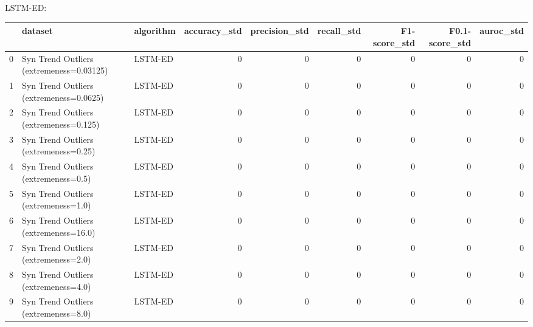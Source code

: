 LSTM-ED:

\begin{tabular}{rllrrrrrr}
\hline
    & dataset                                  & algorithm   &   accuracy\_std &   precision\_std &   recall\_std &   F1-score\_std &   F0.1-score\_std &   auroc\_std \\
\hline
  0 & Syn Trend Outliers (extremeness=0.03125) & LSTM-ED     &              0 &               0 &            0 &              0 &                0 &           0 \\
  1 & Syn Trend Outliers (extremeness=0.0625)  & LSTM-ED     &              0 &               0 &            0 &              0 &                0 &           0 \\
  2 & Syn Trend Outliers (extremeness=0.125)   & LSTM-ED     &              0 &               0 &            0 &              0 &                0 &           0 \\
  3 & Syn Trend Outliers (extremeness=0.25)    & LSTM-ED     &              0 &               0 &            0 &              0 &                0 &           0 \\
  4 & Syn Trend Outliers (extremeness=0.5)     & LSTM-ED     &              0 &               0 &            0 &              0 &                0 &           0 \\
  5 & Syn Trend Outliers (extremeness=1.0)     & LSTM-ED     &              0 &               0 &            0 &              0 &                0 &           0 \\
  6 & Syn Trend Outliers (extremeness=16.0)    & LSTM-ED     &              0 &               0 &            0 &              0 &                0 &           0 \\
  7 & Syn Trend Outliers (extremeness=2.0)     & LSTM-ED     &              0 &               0 &            0 &              0 &                0 &           0 \\
  8 & Syn Trend Outliers (extremeness=4.0)     & LSTM-ED     &              0 &               0 &            0 &              0 &                0 &           0 \\
  9 & Syn Trend Outliers (extremeness=8.0)     & LSTM-ED     &              0 &               0 &            0 &              0 &                0 &           0 \\
\hline
\end{tabular}

